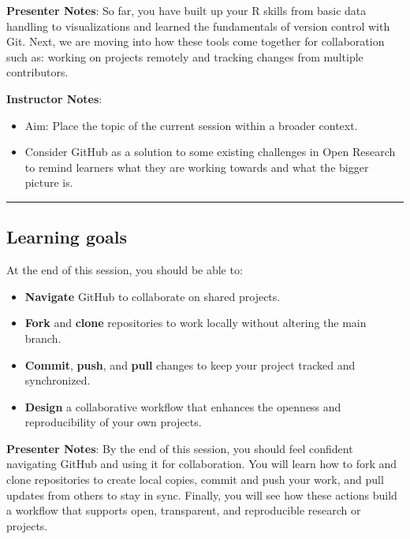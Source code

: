 \documentclass[
  letterpaper,
  DIV=11,
  numbers=noendperiod]{scrartcl}
\providecommand{\tightlist}{%
  \setlength{\itemsep}{0pt}\setlength{\parskip}{0pt}}
\begin{document}
\textbf{Presenter Notes}: So far, you have built up your R skills from
basic data handling to visualizations and learned the fundamentals of
version control with Git. Next, we are moving into how these tools come
together for collaboration such as: working on projects remotely and
tracking changes from multiple contributors.

\textbf{Instructor Notes}:

\begin{itemize}
\item
  Aim: Place the topic of the current session within a broader context.
\item
  Consider GitHub as a solution to some existing challenges in Open
  Research to remind learners what they are working towards and what the
  bigger picture is.
\end{itemize}

\begin{center}\rule{0.5\linewidth}{0.5pt}\end{center}

\subsection{Learning goals}\label{learning-goals}

At the end of this session, you should be able to:

\begin{itemize}
\tightlist
\item
  \textbf{Navigate} GitHub to collaborate on shared projects.
\item
  \textbf{Fork} and \textbf{clone} repositories to work locally without
  altering the main branch.
\item
  \textbf{Commit}, \textbf{push}, and \textbf{pull} changes to keep your
  project tracked and synchronized.
\item
  \textbf{Design} a collaborative workflow that enhances the openness
  and reproducibility of your own projects.
\end{itemize}

\textbf{Presenter Notes}: By the end of this session, you should feel
confident navigating GitHub and using it for collaboration. You will
learn how to fork and clone repositories to create local copies, commit
and push your work, and pull updates from others to stay in sync.
Finally, you will see how these actions build a workflow that supports
open, transparent, and reproducible research or projects.
\end{document}
